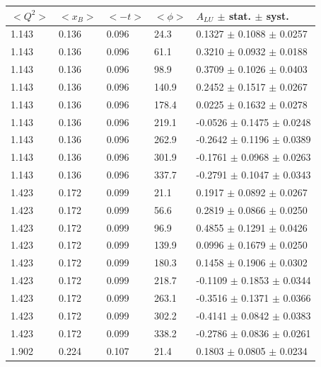 \documentclass{article}
\begin{document}
\begin{table}[!h]
   \begin{center}
      \begin{tabular}{||l|l|l|l|l||}
         \hline
 $<Q^{2}>$ & $<x_{B}>$ & $<-t>$ & $<\phi>$ & $A_{LU}$ $\pm$ stat. $\pm$ syst.\\
         \hline
  1.143 & 0.136 & 0.096 & 24.3  &  0.1327 $\pm$ 0.1088 $\pm$ 0.0257 \\ 
  1.143 & 0.136 & 0.096 & 61.1  &  0.3210 $\pm$ 0.0932 $\pm$ 0.0188 \\ 
  1.143 & 0.136 & 0.096 & 98.9  &  0.3709 $\pm$ 0.1026 $\pm$ 0.0403 \\ 
  1.143 & 0.136 & 0.096 & 140.9 &  0.2452 $\pm$ 0.1517 $\pm$ 0.0267 \\ 
  1.143 & 0.136 & 0.096 & 178.4 &  0.0225 $\pm$ 0.1632 $\pm$ 0.0278 \\ 
  1.143 & 0.136 & 0.096 & 219.1 & -0.0526 $\pm$ 0.1475 $\pm$ 0.0248 \\ 
  1.143 & 0.136 & 0.096 & 262.9 & -0.2642 $\pm$ 0.1196 $\pm$ 0.0389 \\ 
  1.143 & 0.136 & 0.096 & 301.9 & -0.1761 $\pm$ 0.0968 $\pm$ 0.0263 \\ 
  1.143 & 0.136 & 0.096 & 337.7 & -0.2791 $\pm$ 0.1047 $\pm$ 0.0343 \\ 
  \hline                                                                                                           
  1.423 & 0.172 & 0.099 & 21.1  &  0.1917 $\pm$ 0.0892 $\pm$ 0.0267 \\ 
  1.423 & 0.172 & 0.099 & 56.6  &  0.2819 $\pm$ 0.0866 $\pm$ 0.0250 \\ 
  1.423 & 0.172 & 0.099 & 96.9  &  0.4855 $\pm$ 0.1291 $\pm$ 0.0426 \\ 
  1.423 & 0.172 & 0.099 & 139.9 &  0.0996 $\pm$ 0.1679 $\pm$ 0.0250 \\ 
  1.423 & 0.172 & 0.099 & 180.3 &  0.1458 $\pm$ 0.1906 $\pm$ 0.0302 \\ 
  1.423 & 0.172 & 0.099 & 218.7 & -0.1109 $\pm$ 0.1853 $\pm$ 0.0344 \\ 
  1.423 & 0.172 & 0.099 & 263.1 & -0.3516 $\pm$ 0.1371 $\pm$ 0.0366 \\ 
  1.423 & 0.172 & 0.099 & 302.2 & -0.4141 $\pm$ 0.0842 $\pm$ 0.0383 \\ 
  1.423 & 0.172 & 0.099 & 338.2 & -0.2786 $\pm$ 0.0836 $\pm$ 0.0261 \\ 
  \hline                                                                                                           
  1.902 & 0.224 & 0.107 & 21.4  &  0.1803 $\pm$ 0.0805 $\pm$ 0.0234 \\ 

\end{tabular}
\end{center}
\end{table}
\end{document}
